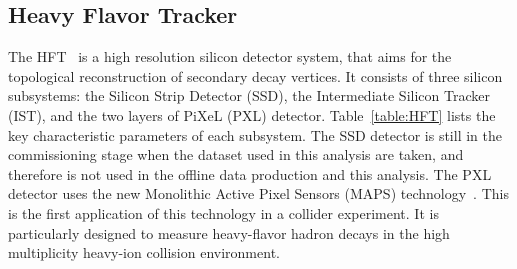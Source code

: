 \documentclass[%
 reprint,	
 amsmath,amssymb,
 aps,
 prc,
]{revtex4-1}
\begin{document}
\subsection{\label{sec:dataset:hft}Heavy Flavor Tracker}
The HFT~\cite{HFTQM14} is a high resolution silicon detector system, that aims for the topological reconstruction of secondary decay vertices. It consists of three silicon subsystems: the Silicon Strip Detector (SSD), the Intermediate Silicon Tracker (IST), and the two layers of PiXeL (PXL) detector. 
Table~\ref{table:HFT} lists the key characteristic parameters of each subsystem. The SSD detector is still in the commissioning stage when the dataset used in this analysis are taken, and therefore is not used in the offline data production and this analysis.
The PXL detector uses the new Monolithic Active Pixel Sensors (MAPS) technology~\cite{PXL}. This is the first application of this technology in a collider experiment. It is particularly designed to measure heavy-flavor hadron decays in the high multiplicity heavy-ion collision environment.

\begin{table}[t]
\end{table}
\end{document}
